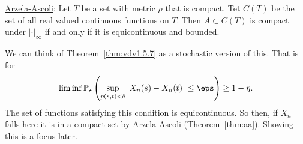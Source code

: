 \begin{remark*}
	\underline{Arzela-Ascoli}: Let \(T\) be a set with metric  \(\rho\) that is compact. Tet  \(C(T)\) be the set of all real valued continuous functions on  \(T\). Then  \(A \subset C(T)\) is compact under  \(\left|\cdot\right|_\infty\) if and only if it is equicontinuous and bounded.

	We can think of Theorem~\ref{thm:vdv1.5.7} as a stochastic version of this. That is for
	\[
		\lim\inf \P_\star\left(\sup_{p(s,t)<\delta}\left|X_n(s) - X_n(t)\right|\leq \eps\right) \geq 1-\eta
	.\] 
	The set of functions satisfying this condition is equicontinuous. So then, if \(X_n\) falls here it is in a compact set by  Arzela-Ascoli (Theorem~\ref{thm:aa}). Showing this is a focus later.
\end{remark*}


